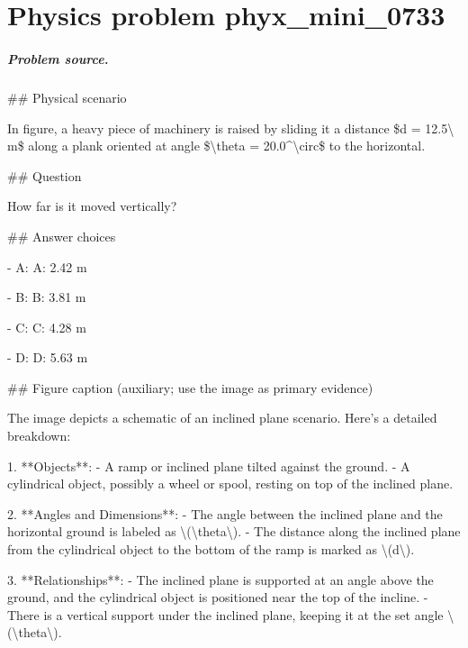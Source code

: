 
\chapter{Physics problem phyx\_mini\_0733}
\label{ch:PhyXMiniProblems_problem_phyx_mini_0733}

\paragraph{Problem source.}
\#\# Physical scenario

In figure, a heavy piece of machinery is raised by sliding it a distance \$d = 12.5\textbackslash{} m\$ along a plank oriented at angle \$\textbackslash{}theta = 20.0\textasciicircum{}\textbackslash{}circ\$ to the horizontal.

\#\# Question

How far is it moved vertically?

\#\# Answer choices

- A: A: 2.42 m

- B: B: 3.81 m

- C: C: 4.28 m

- D: D: 5.63 m

\#\# Figure caption (auxiliary; use the image as primary evidence)

The image depicts a schematic of an inclined plane scenario. Here's a detailed breakdown:

1. **Objects**:
   - A ramp or inclined plane tilted against the ground.
   - A cylindrical object, possibly a wheel or spool, resting on top of the inclined plane.

2. **Angles and Dimensions**:
   - The angle between the inclined plane and the horizontal ground is labeled as \textbackslash{}(\textbackslash{}theta\textbackslash{}).
   - The distance along the inclined plane from the cylindrical object to the bottom of the ramp is marked as \textbackslash{}(d\textbackslash{}).

3. **Relationships**:
   - The inclined plane is supported at an angle above the ground, and the cylindrical object is positioned near the top of the incline.
   - There is a vertical support under the inclined plane, keeping it at the set angle \textbackslash{}(\textbackslash{}theta\textbackslash{}).

